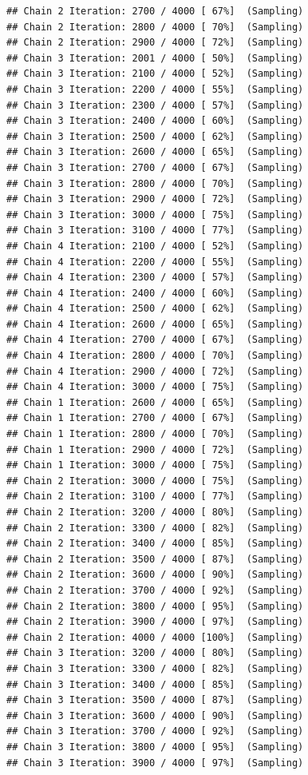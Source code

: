 \documentclass[
]{article}
\begin{document}
\begin{verbatim}
## Chain 2 Iteration: 2700 / 4000 [ 67%]  (Sampling) 
## Chain 2 Iteration: 2800 / 4000 [ 70%]  (Sampling) 
## Chain 2 Iteration: 2900 / 4000 [ 72%]  (Sampling) 
## Chain 3 Iteration: 2001 / 4000 [ 50%]  (Sampling) 
## Chain 3 Iteration: 2100 / 4000 [ 52%]  (Sampling) 
## Chain 3 Iteration: 2200 / 4000 [ 55%]  (Sampling) 
## Chain 3 Iteration: 2300 / 4000 [ 57%]  (Sampling) 
## Chain 3 Iteration: 2400 / 4000 [ 60%]  (Sampling) 
## Chain 3 Iteration: 2500 / 4000 [ 62%]  (Sampling) 
## Chain 3 Iteration: 2600 / 4000 [ 65%]  (Sampling) 
## Chain 3 Iteration: 2700 / 4000 [ 67%]  (Sampling) 
## Chain 3 Iteration: 2800 / 4000 [ 70%]  (Sampling) 
## Chain 3 Iteration: 2900 / 4000 [ 72%]  (Sampling) 
## Chain 3 Iteration: 3000 / 4000 [ 75%]  (Sampling) 
## Chain 3 Iteration: 3100 / 4000 [ 77%]  (Sampling) 
## Chain 4 Iteration: 2100 / 4000 [ 52%]  (Sampling) 
## Chain 4 Iteration: 2200 / 4000 [ 55%]  (Sampling) 
## Chain 4 Iteration: 2300 / 4000 [ 57%]  (Sampling) 
## Chain 4 Iteration: 2400 / 4000 [ 60%]  (Sampling) 
## Chain 4 Iteration: 2500 / 4000 [ 62%]  (Sampling) 
## Chain 4 Iteration: 2600 / 4000 [ 65%]  (Sampling) 
## Chain 4 Iteration: 2700 / 4000 [ 67%]  (Sampling) 
## Chain 4 Iteration: 2800 / 4000 [ 70%]  (Sampling) 
## Chain 4 Iteration: 2900 / 4000 [ 72%]  (Sampling) 
## Chain 4 Iteration: 3000 / 4000 [ 75%]  (Sampling) 
## Chain 1 Iteration: 2600 / 4000 [ 65%]  (Sampling) 
## Chain 1 Iteration: 2700 / 4000 [ 67%]  (Sampling) 
## Chain 1 Iteration: 2800 / 4000 [ 70%]  (Sampling) 
## Chain 1 Iteration: 2900 / 4000 [ 72%]  (Sampling) 
## Chain 1 Iteration: 3000 / 4000 [ 75%]  (Sampling) 
## Chain 2 Iteration: 3000 / 4000 [ 75%]  (Sampling) 
## Chain 2 Iteration: 3100 / 4000 [ 77%]  (Sampling) 
## Chain 2 Iteration: 3200 / 4000 [ 80%]  (Sampling) 
## Chain 2 Iteration: 3300 / 4000 [ 82%]  (Sampling) 
## Chain 2 Iteration: 3400 / 4000 [ 85%]  (Sampling) 
## Chain 2 Iteration: 3500 / 4000 [ 87%]  (Sampling) 
## Chain 2 Iteration: 3600 / 4000 [ 90%]  (Sampling) 
## Chain 2 Iteration: 3700 / 4000 [ 92%]  (Sampling) 
## Chain 2 Iteration: 3800 / 4000 [ 95%]  (Sampling) 
## Chain 2 Iteration: 3900 / 4000 [ 97%]  (Sampling) 
## Chain 2 Iteration: 4000 / 4000 [100%]  (Sampling) 
## Chain 3 Iteration: 3200 / 4000 [ 80%]  (Sampling) 
## Chain 3 Iteration: 3300 / 4000 [ 82%]  (Sampling) 
## Chain 3 Iteration: 3400 / 4000 [ 85%]  (Sampling) 
## Chain 3 Iteration: 3500 / 4000 [ 87%]  (Sampling) 
## Chain 3 Iteration: 3600 / 4000 [ 90%]  (Sampling) 
## Chain 3 Iteration: 3700 / 4000 [ 92%]  (Sampling) 
## Chain 3 Iteration: 3800 / 4000 [ 95%]  (Sampling) 
## Chain 3 Iteration: 3900 / 4000 [ 97%]  (Sampling) 

\end{verbatim}
\end{document}
